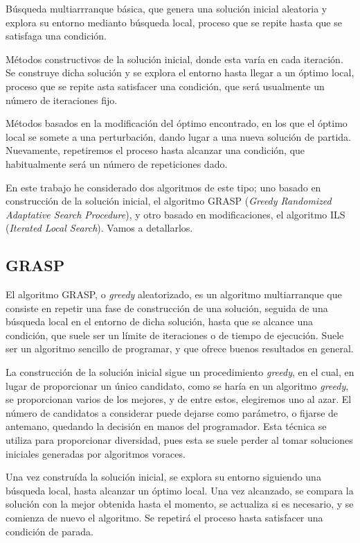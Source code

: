 Búsqueda multiarrranque básica, que genera una solución inicial aleatoria y explora su entorno
medianto búsqueda local, proceso que se repite hasta que se satisfaga una condición.

Métodos constructivos de la solución inicial, donde esta varía en cada iteración. Se construye dicha
solución y se explora el entorno hasta llegar a un óptimo local, proceso que se repite asta
satisfacer una condición, que será usualmente un número de iteraciones fijo.

Métodos basados en la modificación del óptimo encontrado, en los que el óptimo local se somete
a una perturbación, dando lugar a una nueva solución de partida. Nuevamente, repetiremos el
proceso hasta alcanzar una condición, que habitualmente será un número de repeticiones dado.

En este trabajo he considerado dos algoritmos de este tipo; uno basado en construcción de la solución
inicial, el algoritmo GRASP (\textit{Greedy Randomized Adaptative Search Procedure}), y otro basado
en modificaciones, el algoritmo ILS (\textit{Iterated Local Search}). Vamos a detallarlos.

\subsection{GRASP}

El algoritmo GRASP, o \textit{greedy} aleatorizado, es un algoritmo multiarranque que consiste en repetir
una fase de construcción de una solución, seguida de una búsqueda local en el entorno de dicha solución,
hasta que se alcance una condición, que suele ser un límite de iteraciones o de tiempo de ejecución.
Suele ser un algoritmo sencillo de programar, y que ofrece buenos resultados en general.

La construcción de la solución inicial sigue un procedimiento \textit{greedy}, en el cual, en lugar de
proporcionar un único candidato, como se haría en un algoritmo \textit{greedy}, se proporcionan
varios de los mejores, y de entre estos, elegiremos uno al azar. El número de candidatos a considerar
puede dejarse como parámetro, o fijarse de antemano, quedando la decisión en manos del programador.
Esta técnica se utiliza para proporcionar diversidad, pues esta se suele perder al tomar soluciones iniciales
generadas por algoritmos voraces.

Una vez construída la solución inicial, se explora su entorno siguiendo una búsqueda local, hasta alcanzar
un óptimo local. Una vez alcanzado, se compara la solución con la mejor obtenida hasta el momento, se
actualiza si es necesario, y se comienza de nuevo el algoritmo. Se repetirá el proceso hasta satisfacer
una condición de parada.

